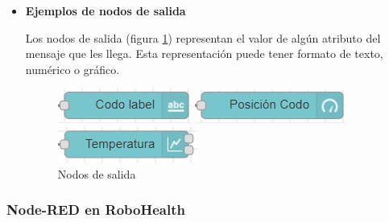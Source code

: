 \begin{itemize}
\begin{itemize}
\item \textbf{Ejemplos de nodos de salida}

Los nodos de salida (figura \ref{fig:nodeoutput}) representan el valor de algún atributo del mensaje que les llega. Esta representación puede tener formato de texto, numérico o gráfico.

\begin{figure}[H]
  \centering
  \begin{minipage}[t]{0.3\textwidth}
    \includegraphics[width=\textwidth]{figuras/textNode.png}
  \end{minipage}
  \hfill
  \begin{minipage}[t]{0.3\textwidth}
    \includegraphics[width=\textwidth]{figuras/gaugeNode.png}
  \end{minipage}
  \hfill
  \begin{minipage}[t]{0.3\textwidth}
    \includegraphics[width=\textwidth]{figuras/chartNode.png}
  \end{minipage}
  \caption{Nodos de salida}\label{fig:nodeoutput}
\end{figure}

\end{itemize}
\end{itemize}

\subsubsection{Node-RED en RoboHealth}

